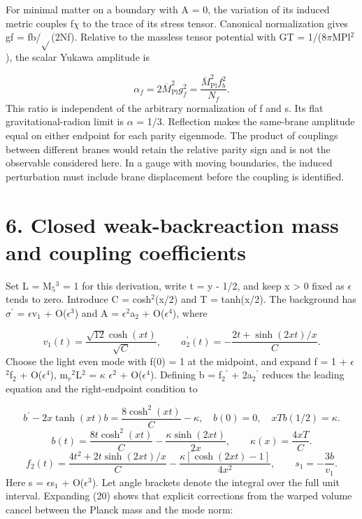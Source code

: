 \documentclass[11pt]{article}
\begin{document}
For minimal matter on a boundary with A = 0, the variation of its induced metric couples f\(\chi\) to the trace of its stress tensor. Canonical normalization gives gf = fb/\(\sqrt{}\)(2Nf). Relative to the massless tensor potential with GT = 1/(8\(\pi\)MPl\({}^2\)), the scalar Yukawa amplitude is

\begin{equation}
\alpha_f=2\overline{M}_{\mathrm{Pl}}^2g_f^2=\frac{\overline{M}_{\mathrm{Pl}}^2f_b^2}{N_f}.\tag{20}
\end{equation}
This ratio is independent of the arbitrary normalization of f and s. Its flat gravitational-radion limit is \(\alpha\) = 1/3. Reflection makes the same-brane amplitude equal on either endpoint for each parity eigenmode. The product of couplings between different branes would retain the relative parity sign and is not the observable considered here. In a gauge with moving boundaries, the induced perturbation must include brane displacement before the coupling is identified.

\section*{6. Closed weak-backreaction mass and coupling coefficients}
Set L = M\({}_5\)\({}^3\) = 1 for this derivation, write t = y - 1/2, and keep x > 0 fixed as \(\epsilon\) tends to zero. Introduce C = cosh\({}^2\)(x/2) and T = tanh(x/2). The background has \(\sigma\)\({}^\prime\) = \(\epsilon\)v\({}_1\) + O(\(\epsilon\)\({}^3\)) and A = \(\epsilon\)\({}^2\)a\({}_2\) + O(\(\epsilon\)\({}^4\)), where

\begin{equation}
v_1(t)=\frac{\sqrt{12}\cosh(xt)}{\sqrt C},\qquad a_2^\prime(t)=-\frac{2t+\sinh(2xt)/x}{C}.\tag{21}
\end{equation}
Choose the light even mode with f(0) = 1 at the midpoint, and expand f = 1 + \(\epsilon\)\({}^2\)f\({}_2\) + O(\(\epsilon\)\({}^4\)), m\({}_r\)\({}^2\)L\({}^2\) = \(\kappa\) \(\epsilon\)\({}^2\) + O(\(\epsilon\)\({}^4\)). Defining b = f\({}_2\)\({}^\prime\) + 2a\({}_2\)\({}^\prime\) reduces the leading equation and the right-endpoint condition to

\begin{equation}
b^\prime-2x\tanh(xt)b=\frac{8\cosh^2(xt)}{C}-\kappa,\quad b(0)=0,\quad xTb(1/2)=\kappa.\tag{22}
\end{equation}
\begin{equation}
b(t)=\frac{8t\cosh^2(xt)}{C}-\frac{\kappa\sinh(2xt)}{2x},\qquad \kappa(x)=\frac{4xT}{C}.\tag{23}
\end{equation}
\begin{equation}
f_2(t)=\frac{4t^2+2t\sinh(2xt)/x}{C}-\frac{\kappa[\cosh(2xt)-1]}{4x^2},\qquad s_1=-\frac{3b}{v_1}.\tag{24}
\end{equation}
Here s = \(\epsilon\)s\({}_1\) + O(\(\epsilon\)\({}^3\)). Let angle brackets denote the integral over the full unit interval. Expanding (20) shows that explicit corrections from the warped volume cancel between the Planck mass and the mode norm:
\end{document}
